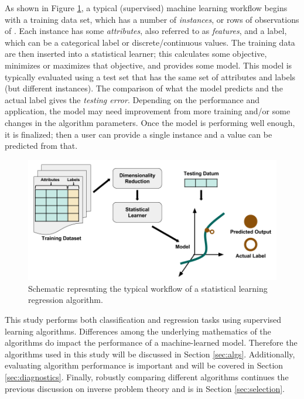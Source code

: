 As shown in Figure \ref{fig:supervised}, a typical (supervised) machine
learning workflow begins with a training data set, which has a number of
\textit{instances}, or rows of observations of .  Each instance has some \textit{attributes}, also referred to as \textit{features}, and a label, which
can be a categorical label or discrete/continuous values.  The training data
are then inserted into a statistical learner; this calculates some objective,
minimizes or maximizes that objective, and provides some model. This model is
typically evaluated using a test set that has the same set of attributes and
labels (but different instances). The comparison of what the model predicts and
the actual label gives the \textit{testing error}. Depending on the performance
and application, the model may need improvement from more training and/or some
changes in the algorithm parameters. Once the model is performing well enough,
it is finalized; then a user can provide a single instance and a value can be
predicted from that. 

\begin{figure}[h!]
  \includegraphics[width=\linewidth]{./chapters/intro/SupervisedRegression.png}
  \caption{Schematic represnting the typical workflow of a statistical learning regression algorithm.}
  \label{fig:supervised}
\end{figure}

This study performs both classification and regression tasks using supervised
learning algorithms.  Differences among the underlying mathematics  of the algorithms do impact the performance of a machine-learned model.
Therefore the algorithms used in this study will be discussed in
Section \ref{sec:algs}. Additionally, evaluating algorithm performance is 
important and will be covered in Section \ref{sec:diagnostics}. Finally, 
robustly comparing different algorithms continues the previous discussion on 
inverse problem theory and is in Section \ref{sec:selection}.

